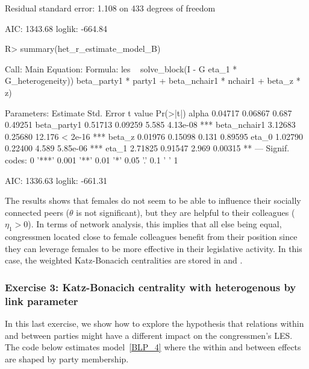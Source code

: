 \documentclass[nojss]{jss}
\begin{document}
\begin{CodeChunk}
\begin{CodeOutput}
			Residual standard error: 1.108 on 433 degrees of freedom
			
			AIC: 1343.68  loglik: -664.84
		\end{CodeOutput}
		\begin{CodeInput}
			R> summary(het_r_estimate_model_B)
		\end{CodeInput}
		\begin{CodeOutput}
			Call:
			Main Equation:  
			Formula: les ~ solve_block(I - G %
			eta_1 * G_heterogeneity)) %
			beta_party1 * party1 + beta_nchair1 * nchair1 + beta_z * z)
			
			Parameters:
			Estimate Std. Error t value Pr(>|t|)    
			alpha         0.04717    0.06867   0.687  0.49251    
			beta_party1   0.51713    0.09259   5.585 4.13e-08 ***
			beta_nchair1  3.12683    0.25680  12.176  < 2e-16 ***
			beta_z        0.01976    0.15098   0.131  0.89595    
			eta_0         1.02790    0.22400   4.589 5.85e-06 ***
			eta_1         2.71825    0.91547   2.969  0.00315 ** 
			---
			Signif. codes:  0 '***' 0.001 '**' 0.01 '*' 0.05 '.' 0.1 ' ' 1
			
			AIC: 1336.63  loglik: -661.31
		\end{CodeOutput}
	\end{CodeChunk}
	The results shows that females do not seem to be able to influence their socially connected peers ($\theta$ is not significant), but they are helpful to their colleagues ($\eta_{1}>0$). In terms of network analysis, this implies that all else being equal, congressmen located close to female colleagues benefit from their position since they can leverage females to be more effective in their legislative activity. In this case, the weighted Katz-Bonacich centralities are stored in 
	and .
	
	\subsubsection{Exercise 3: Katz-Bonacich centrality with heterogenous by link parameter}
	
	In this last exercise, we show how to explore the hypothesis that relations within and between parties might have a different impact on the congressmen's LES. The code below estimates model~\ref{BLP_4} where the within and between effects are shaped by party membership.
	
\end{document}
